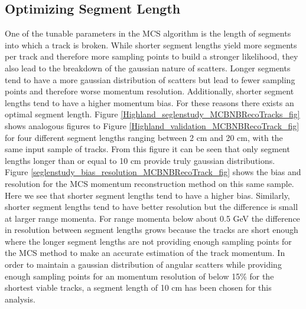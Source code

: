 \subsection{Optimizing Segment Length}\label{SegmentLength_MCBNBRecoTrack_section}
One of the tunable parameters in the MCS algorithm is the length of segments into which a track is broken. While shorter segment lengths yield more segments per track and therefore more sampling points to build a stronger likelihood, they also lead to the breakdown of the gaussian nature of scatters. Longer segments tend to have a more gaussian distribution of scatters but lead to fewer sampling points and therefore worse momentum resolution. Additionally, shorter segment lengths tend to have a higher momentum bias. For these reasons there exists an optimal segment length. Figure \ref{Highland_seglenstudy_MCBNBRecoTracks_fig} shows analogous figures to Figure \ref{Highland_validation_MCBNBRecoTrack_fig} for four different segment lengths ranging between 2 cm and 20 cm, with the same input sample of tracks. From this figure it can be seen that only segment lengths longer than or equal to 10 cm provide truly gaussian distributions.\\
Figure \ref{seglenstudy_bias_resolution_MCBNBRecoTrack_fig} shows the bias and resolution for the MCS momentum reconstruction method on this same sample. Here we see that shorter segment lengths tend to have a higher bias. Similarly, shorter segment lengths tend to have better resolution but the difference is small at larger range momenta. For range momenta below about 0.5 GeV the difference in resolution between segment lengths grows because the tracks are short enough where the longer segment lengths are not providing enough sampling points for the MCS method to make an accurate estimation of the track momentum. In order to maintain a gaussian distribution of angular scatters while providing enough sampling points for an momentum resolution of below 15\% for the shortest viable tracks, a segment length of 10 cm has been chosen for this analysis.

